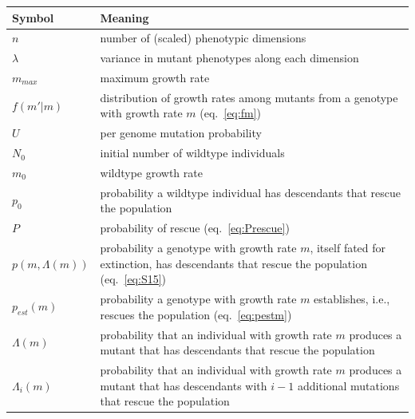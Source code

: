 \documentclass[9pt,twocolumn,twoside,lineno]{gsajnl}
\begin{document}
\begin{table}[!h]
\begin{tabular}{p{1.5cm} p{6.5cm}}
\hline
Symbol & Meaning \\
\hline
\hline
$n$ & number of (scaled) phenotypic dimensions\\
$\lambda$ & variance in mutant phenotypes along each dimension\\
$m_{max}$ & maximum growth rate\\
$f(m'|m)$ & distribution of growth rates among mutants from a genotype with growth rate $m$ (eq.\ \ref{eq:fm})\\
$U$ & per genome mutation probability\\ 
$N_0$ & initial number of wildtype individuals\\
$m_0$ & wildtype growth rate\\
$p_0$ & probability a wildtype individual has descendants that rescue the population\\
$P$ & probability of rescue (eq.\ \ref{eq:Prescue})\\
$p(m,\Lambda(m))$ & probability a genotype with growth rate $m$, itself fated for extinction, has descendants that rescue the population (eq.\ \ref{eq:S15})\\
$p_{est}(m)$ & probability a genotype with growth rate $m$ establishes, i.e., rescues the population (eq.\ \ref{eq:pestm})\\
$\Lambda(m)$ & probability that an individual with growth rate $m$ produces a mutant that has descendants that rescue the population\\
$\Lambda_i(m)$ & probability that an individual with growth rate $m$ produces a mutant that has descendants with $i-1$ additional mutations that rescue the population\\

\end{tabular}
\end{table}
\end{document}
